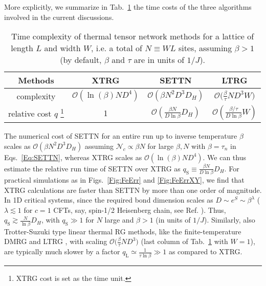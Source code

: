 \documentclass[aps,prx,twocolumn,showpacs,psfig,superscriptaddress,longbibliography]{revtex4-1}
\newcommand{\order}[1]{\mathcal{O}{\left(#1\right)}}
\newcommand{\orderb}[1]{\mathcal{O}{\bigl(#1\bigr)}}
\newcommand{\Eqs}[1]{Eqs.~\eqref{#1}}
\begin{document}
More explicitly, we summarize in Tab.~\ref{Tab:Cost}
the time costs of the three algorithms involved in the current
discussions.
%
\begin{table}[tb]
\caption{ 
   Time complexity of thermal tensor network
   methods for a lattice of
   length $L$ and width $W$,
   i.e. a total of $N\equiv W L$ sites,
   assuming $\beta>1$
   (by default, $\beta$ and $\tau$ are 
   in units of $1/J$).}
\begin{tabular}{cccc}
    \toprule
    Methods & XTRG & SETTN  & LTRG \\
    \hline
    complexity &  $\order{\ln(\beta)N D^4}$ & $\order{\beta N^2 D^3 D_H}$ & $\orderb{\frac{\beta}{\tau} N D^3 W}$ \\       
    relative cost $q$ \footnote{XTRG cost is set as the time unit.} & 1 &
    $\order{\tfrac{\beta N}{D \ln{\beta}} D_H}$ &
    $\order{\frac{\beta/ \tau}{D \ln{\beta}} W}$ \\    
    \hline\hline
\end{tabular}
\label{Tab:Cost}
\end{table}
%
The numerical cost of SETTN for an entire run up to inverse
temperature $\beta$ scales as $\order{\beta N^2 D^3 D_H}$ assuming
$\mathcal{N}_c \propto \beta N$ for large $\beta,N$ with
$\beta=\tau_n$ in \Eqs{Eq:SETTN}, whereas XTRG scales as
$\order{\ln(\beta)N D^4}$.  We can thus estimate the relative run
time of SETTN over XTRG as $q_\mathrm{S}\equiv \tfrac{\beta
N}{D\ln{\beta}} D_H$.
%
For practical simulations as in Figs.~\ref{Fig:FeErr} and
\ref{Fig:FeErrXY}, we find that XTRG calculations are faster than
SETTN by more than one order of magnitude. In 1D critical systems,
since the required bond dimension scales as $D\sim e^S \sim
\beta^{\lambda}$ ($\lambda \lesssim 1$ for $c=1$ CFTs, say, spin-1/2
Heisenberg chain, see Ref. ).
Thus, $q_\mathrm{S} \gtrsim \tfrac{N}{\ln{\beta}} D_H$, with
$q_\mathrm{S} \gg 1$ for $N$ large and $\beta>1$ (in units of
$1/J$). Similarly, also Trotter-Suzuki type linear thermal RG
methods, like the finite-temperature DMRG
\cite{Feiguin.a.e+:2005:ftDMRG} and LTRG \cite{Li.w+:2011:LTRG,
Dong.y+:2017:BiLTRG}, with scaling $\orderb{\frac{\beta}{\tau} N
D^3}$ (last column of Tab.~\ref{Tab:Cost} with $W=1$), are
typically much slower by a factor $q_\mathrm{L} \simeq
\frac{1}{\tau \ln{\beta}} \gg 1$ as compared to XTRG. 
\end{document}
